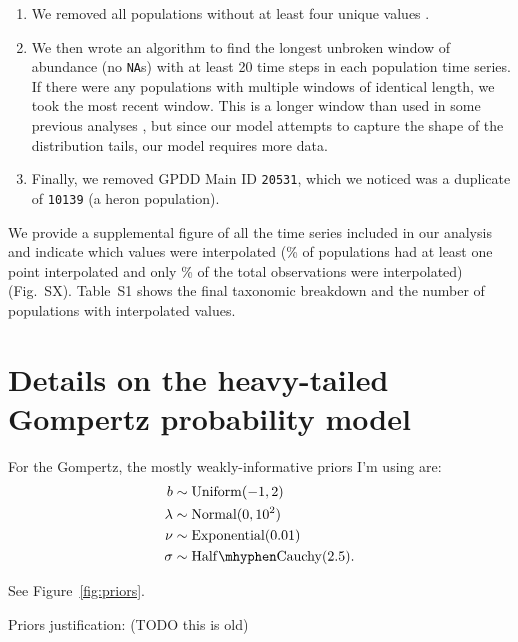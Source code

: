 \documentclass[12pt]{article}
\begin{document}
\begin{enumerate}
\item We removed all populations without at least four unique values \citep[following][]{brook2006a}.
\item We then wrote an algorithm to find the longest unbroken window of abundance (no \texttt{NA}s) with at least 20 time steps in each population time series.  If there were any populations with multiple windows of identical length, we took the most recent window. This is a longer window than used in some previous analyses \citep[e.g.][]{brook2006a}, but since our model attempts to capture the shape of the distribution tails, our model requires more data.
\item Finally, we removed GPDD Main ID \texttt{20531}, which we noticed was a duplicate of \texttt{10139} (a heron population).
\end{enumerate}

We provide a supplemental figure of all the time series included in our analysis and indicate which values were interpolated (\percImputedPops\% of populations had at least one point interpolated and only \percImputedPoints\% of the total observations were interpolated) (Fig.\ SX). Table~S1 shows the final taxonomic breakdown and the number of populations with interpolated values.

\section{Details on the heavy-tailed Gompertz probability model}

For the Gompertz, the mostly weakly-informative priors I'm using are:
\begin{align*}
b &\sim \mathrm{Uniform}(-1, 2)\\
\lambda &\sim \mathrm{Normal}(0, 10^2)\\
\nu &\sim \mathrm{Exponential}(0.01)\\
\sigma &\sim \mathrm{Half\mhyphen Cauchy} (2.5).
\end{align*}

See Figure~\ref{fig:priors}.

Priors justification: (TODO this is old)
\end{document}
